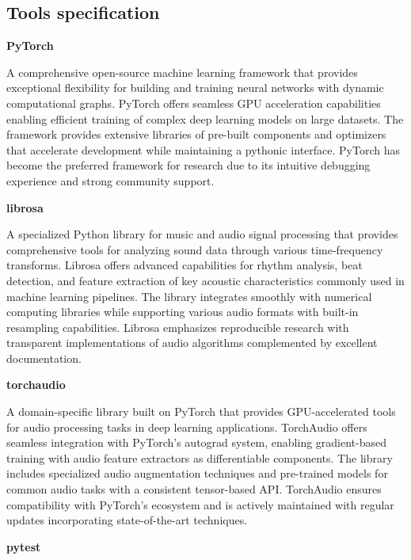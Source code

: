 \documentclass[
    bindingoffset=5mm,  %
    footnoteindent=3mm, %
    hyphenation=true    %
]{src/wut-thesis}
\begin{document}
\subsection{Tools specification} \label{ch:ToolsSpecification}
\begin{description}
\item \textbf{PyTorch}

A comprehensive open-source machine learning framework that provides exceptional flexibility for building and training neural networks with dynamic computational graphs. PyTorch offers seamless GPU acceleration capabilities enabling efficient training of complex deep learning models on large datasets. The framework provides extensive libraries of pre-built components and optimizers that accelerate development while maintaining a pythonic interface. PyTorch has become the preferred framework for research due to its intuitive debugging experience and strong community support.

\item \textbf{librosa}

A specialized Python library for music and audio signal processing that provides comprehensive tools for analyzing sound data through various time-frequency transforms. Librosa offers advanced capabilities for rhythm analysis, beat detection, and feature extraction of key acoustic characteristics commonly used in machine learning pipelines. The library integrates smoothly with numerical computing libraries while supporting various audio formats with built-in resampling capabilities. Librosa emphasizes reproducible research with transparent implementations of audio algorithms complemented by excellent documentation.

\item \textbf{torchaudio}

A domain-specific library built on PyTorch that provides GPU-accelerated tools for audio processing tasks in deep learning applications. TorchAudio offers seamless integration with PyTorch's autograd system, enabling gradient-based training with audio feature extractors as differentiable components. The library includes specialized audio augmentation techniques and pre-trained models for common audio tasks with a consistent tensor-based API. TorchAudio ensures compatibility with PyTorch's ecosystem and is actively maintained with regular updates incorporating state-of-the-art techniques.

\item \textbf{pytest}


\end{description}
\end{document}
